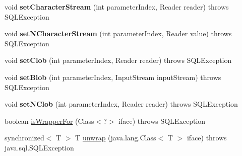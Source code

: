 \begin{DoxyCompactItemize}
\mbox{\label{classcom_1_1mysql_1_1jdbc_1_1jdbc2_1_1optional_1_1_j_d_b_c4_prepared_statement_wrapper_af2b1d9b35ed912180a8875c454703758}} 
void {\bfseries set\+Character\+Stream} (int parameter\+Index, Reader reader)  throws S\+Q\+L\+Exception 
\item 
\mbox{\label{classcom_1_1mysql_1_1jdbc_1_1jdbc2_1_1optional_1_1_j_d_b_c4_prepared_statement_wrapper_acd36f4dbd30f2b33ffd8ed6e4246f1c3}} 
void {\bfseries set\+N\+Character\+Stream} (int parameter\+Index, Reader value)  throws S\+Q\+L\+Exception 
\item 
\mbox{\label{classcom_1_1mysql_1_1jdbc_1_1jdbc2_1_1optional_1_1_j_d_b_c4_prepared_statement_wrapper_a6af12a417efb80d8afae76cf03df8f57}} 
void {\bfseries set\+Clob} (int parameter\+Index, Reader reader)  throws S\+Q\+L\+Exception 
\item 
\mbox{\label{classcom_1_1mysql_1_1jdbc_1_1jdbc2_1_1optional_1_1_j_d_b_c4_prepared_statement_wrapper_a0f5623e542da2b9802e1e8117933e6d8}} 
void {\bfseries set\+Blob} (int parameter\+Index, Input\+Stream input\+Stream)  throws S\+Q\+L\+Exception 
\item 
\mbox{\label{classcom_1_1mysql_1_1jdbc_1_1jdbc2_1_1optional_1_1_j_d_b_c4_prepared_statement_wrapper_ac35304c7e3199623639d39b1eb97e5a4}} 
void {\bfseries set\+N\+Clob} (int parameter\+Index, Reader reader)  throws S\+Q\+L\+Exception 
\item 
boolean \mbox{\hyperlink{classcom_1_1mysql_1_1jdbc_1_1jdbc2_1_1optional_1_1_j_d_b_c4_prepared_statement_wrapper_ad24e8bf78c2de9333ec47ea3baa517d4}{is\+Wrapper\+For}} (Class$<$?$>$ iface)  throws S\+Q\+L\+Exception 
\item 
synchronized$<$ T $>$ T \mbox{\hyperlink{classcom_1_1mysql_1_1jdbc_1_1jdbc2_1_1optional_1_1_j_d_b_c4_prepared_statement_wrapper_ad0e4c0a8f55780588767fc38546217f3}{unwrap}} (java.\+lang.\+Class$<$ T $>$ iface)  throws java.\+sql.\+S\+Q\+L\+Exception 
\end{DoxyCompactItemize}
